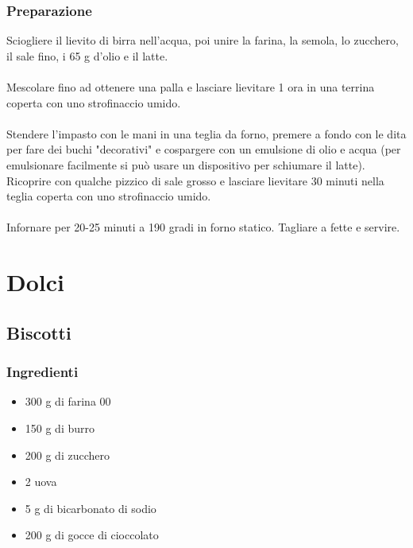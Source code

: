 \documentclass[12pt, a4paper]{article}
\begin{document}
\subsubsection{Preparazione}
	Sciogliere il lievito di birra nell'acqua, poi unire la farina, la semola,
	lo zucchero, il sale fino, i 65 g d'olio e il latte.\\\\
	Mescolare fino ad ottenere una palla e lasciare lievitare 1 ora in una
	terrina coperta con uno strofinaccio umido.\\\\ 
	Stendere l'impasto con le mani in una teglia da forno, premere a fondo con
	le dita per fare dei buchi "decorativi" e cospargere con un emulsione di olio
	e acqua (per emulsionare facilmente si può usare un dispositivo per schiumare 
	il latte). Ricoprire con qualche pizzico di sale grosso e lasciare lievitare
	30 minuti nella teglia coperta con uno strofinaccio umido.\\\\
	Infornare per 20-25 minuti a 190 gradi in forno statico. Tagliare a fette e servire.
\clearpage

\section{Dolci}

\subsection{Biscotti}

\subsubsection{Ingredienti}
\begin{itemize}
\item 	300 g di farina 00
\item	150 g di burro
\item	200 g di zucchero
\item	2 uova
\item	5 g di bicarbonato di sodio
\item	200 g di gocce di cioccolato
\end{itemize}
\end{document}
